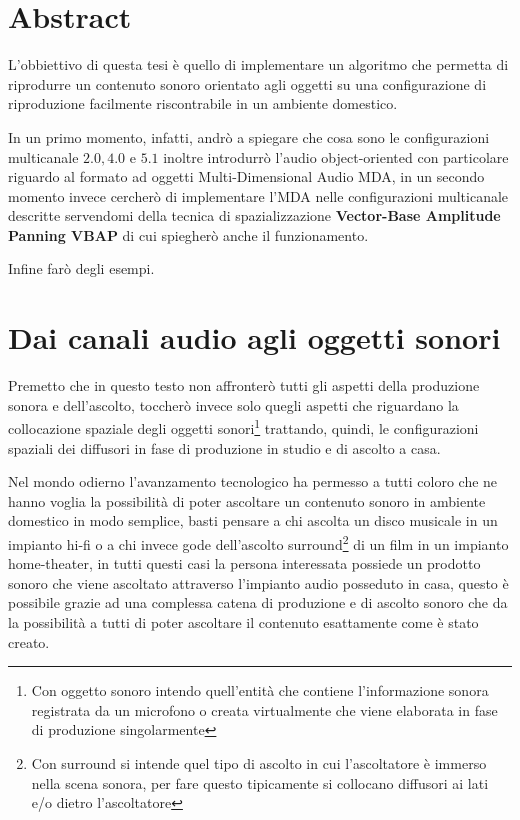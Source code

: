 \documentclass[12pt,a4paper]{report}
\begin{document}
\tableofcontents

\listoffigures



\chapter*{Abstract}

L'obbiettivo di questa tesi è quello di implementare un algoritmo che permetta di riprodurre un contenuto sonoro orientato agli oggetti su una configurazione di riproduzione facilmente riscontrabile in un ambiente domestico.

In un primo momento, infatti, andrò a spiegare che cosa sono le configurazioni multicanale $2.0, 4.0$ e $5.1$ inoltre introdurrò l'audio object-oriented con particolare riguardo al formato ad oggetti Multi-Dimensional Audio MDA, in un secondo momento invece cercherò di implementare l'MDA nelle configurazioni multicanale descritte servendomi della tecnica di spazializzazione \textbf{Vector-Base Amplitude Panning VBAP} di cui spiegherò anche il funzionamento.

Infine farò degli esempi.


\chapter{Dai canali audio agli oggetti sonori}

Premetto che in questo testo non affronterò tutti gli aspetti della produzione sonora e dell'ascolto, toccherò invece solo quegli aspetti che riguardano la collocazione spaziale degli oggetti sonori\footnote{Con oggetto sonoro intendo quell'entità che contiene l'informazione sonora registrata da un microfono o creata virtualmente che viene elaborata in fase di produzione singolarmente} trattando, quindi, le configurazioni spaziali dei diffusori in fase di produzione in studio e di ascolto a casa.

Nel mondo odierno l'avanzamento tecnologico ha permesso a tutti coloro che ne hanno voglia la possibilità di poter ascoltare un contenuto sonoro in ambiente domestico in modo semplice, basti pensare a chi ascolta un disco musicale in un impianto hi-fi o a chi invece gode dell'ascolto surround\footnote{Con surround si intende quel tipo di ascolto in cui l'ascoltatore è immerso nella scena sonora, per fare questo tipicamente si collocano diffusori ai lati e/o dietro l'ascoltatore} di un film in un impianto home-theater, in tutti questi casi la persona interessata possiede un prodotto sonoro che viene ascoltato attraverso l'impianto audio posseduto in casa, questo è possibile grazie ad una complessa catena di produzione e di ascolto sonoro che da la possibilità a tutti di poter ascoltare il contenuto esattamente come è stato creato.
\end{document}
